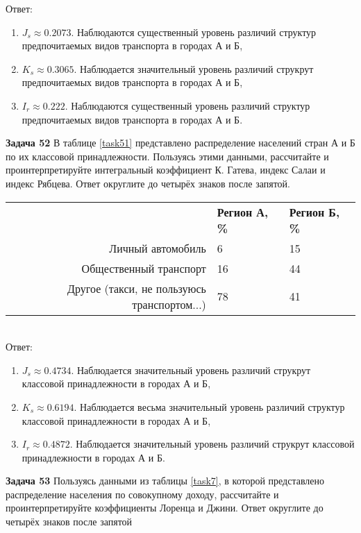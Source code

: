 \documentclass{article}
\begin{document}
Ответ: \begin{enumerate}
\item $J_s\approx 0.2073$. Наблюдаются существенный уровень различий структур предпочитаемых видов транспорта в городах А и Б,
\item $K_s\approx 0.3065$. Наблюдается значительный уровень различий струкрут предпочитаемых видов транспорта в городах А и Б,
\item $I_r\approx 0.222$. Наблюдаются существенный уровень различий структур предпочитаемых видов транспорта в городах А и Б.
\end{enumerate}

\textbf{Задача 52} В таблице \ref{task51} представлено распределение населений стран А и Б по их классовой принадлежности. Пользуясь этими данными, рассчитайте и проинтерпретируйте интегральный коэффициент К. Гатева, индекс Салаи и индекс Рябцева. Ответ округлите до четырёх знаков после запятой.\\

\begin{minipage}{\textwidth}
\centering
\begin{tabularx}{0.7\textwidth}{rYY}
\toprule
 & \textbf{Регион А, \%} & \textbf{Регион Б, \%} \\
\cmidrule(lr){2-2}\cmidrule(lr){3-3}
Личный автомобиль & 6 & 15 \\

Общественный транспорт & 16 & 44 \\

Другое (такси, не пользуюсь транспортом...) & 78 & 41 \\
\bottomrule
\end{tabularx}
\label{task4}
\end{minipage} \\[35pt]

Ответ: \begin{enumerate}
\item $J_s\approx 0.4734$. Наблюдается значительный уровень различий струкрут классовой принадлежности в городах А и Б,
\item $K_s\approx 0.6194$. Наблюдается весьма значительный уровень различий структур классовой принадлежности в городах А и Б,
\item $I_r\approx 0.4872$. Наблюдается значительный уровень различий струкрут классовой принадлежности в городах А и Б.
\end{enumerate}

\textbf{Задача 53} Пользуясь данными из таблицы \ref{task7}, в которой представлено распределение населения по совокупному доходу, рассчитайте и проинтерпретируйте коэффициенты Лоренца и Джини. Ответ округлите до четырёх знаков после запятой\\
\end{document}
